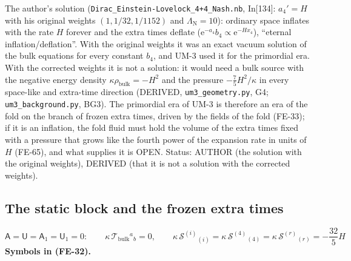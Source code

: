 \documentclass[
  10pt,
]{article}
\begin{document}
The author's solution (\texttt{Dirac\_Einstein-Lovelock\_4+4\_Nash.nb},
In{[}134{]}: \(a_4' = H\) with his original weights
\((1, 1/32, 1/1152)\) and \(\Lambda_{\mathrm{N}} = 10\)): ordinary space
inflates with the rate \(H\) forever and the extra times deflate
(\(\mathrm{e}^{-a_4}b_4 \propto \mathrm{e}^{-Hx_4}\)), ``eternal
inflation/deflation''. With the original weights it was an exact vacuum
solution of the bulk equations for every constant \(b_4\), and UM-3 used
it for the primordial era. With the corrected weights it is not a
solution: it would need a bulk source with the negative energy density
\(\kappa\rho_{\mathrm{bulk}} = -H^2\) and the pressure
\(-\frac75H^2/\kappa\) in every space-like and extra-time direction
(DERIVED, \texttt{um3\_geometry.py}, G4; \texttt{um3\_background.py},
BG3). The primordial era of UM-3 is therefore an era of the fold on the
branch of frozen extra times, driven by the fields of the fold (FE-33);
if it is an inflation, the fold fluid must hold the volume of the extra
times fixed with a pressure that grows like the fourth power of the
expansion rate in units of \(H\) (FE-65), and what supplies it is OPEN.
Status: AUTHOR (the solution with the original weights), DERIVED (that
it is not a solution with the corrected weights).

\hypertarget{the-static-block-and-the-frozen-extra-times}{%
\subsection{The static block and the frozen extra
times}\label{the-static-block-and-the-frozen-extra-times}}

\[
\mathsf{A} = \mathsf{U} = \mathsf{A}_1 = \mathsf{U}_1 = 0:\qquad \kappa\,\mathcal{T}_{\mathrm{bulk}}{}^a{}_b = 0,\qquad
\kappa\,\mathcal{S}^{(i)}{}_{(i)} = \kappa\,\mathcal{S}^{(4)}{}_{(4)} = \kappa\,\mathcal{S}^{(r)}{}_{(r)} = -\frac{32}{5}H \tag{FE-32}
\] \textbf{Symbols in (FE-32).}
\end{document}
